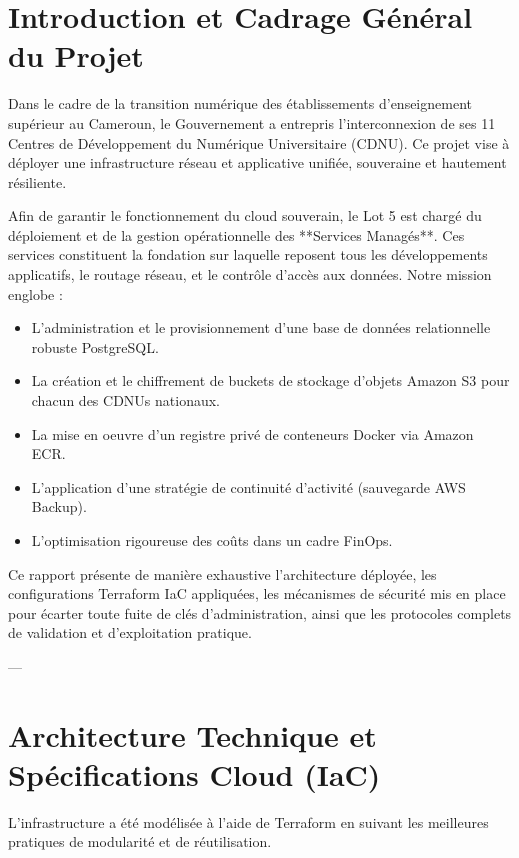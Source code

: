 \documentclass[12pt,a4paper]{article}
\begin{document}
\newpage
\tableofcontents
\newpage

\section{Introduction et Cadrage Général du Projet}
Dans le cadre de la transition numérique des établissements d'enseignement supérieur au Cameroun, le Gouvernement a entrepris l'interconnexion de ses 11 Centres de Développement du Numérique Universitaire (CDNU). Ce projet vise à déployer une infrastructure réseau et applicative unifiée, souveraine et hautement résiliente. 

Afin de garantir le fonctionnement du cloud souverain, le Lot 5 est chargé du déploiement et de la gestion opérationnelle des **Services Managés**. Ces services constituent la fondation sur laquelle reposent tous les développements applicatifs, le routage réseau, et le contrôle d'accès aux données. Notre mission englobe :
\begin{itemize}
    \item L'administration et le provisionnement d'une base de données relationnelle robuste PostgreSQL.
    \item La création et le chiffrement de buckets de stockage d'objets Amazon S3 pour chacun des CDNUs nationaux.
    \item La mise en oeuvre d'un registre privé de conteneurs Docker via Amazon ECR.
    \item L'application d'une stratégie de continuité d'activité (sauvegarde AWS Backup).
    \item L'optimisation rigoureuse des coûts dans un cadre FinOps.
\end{itemize}

Ce rapport présente de manière exhaustive l'architecture déployée, les configurations Terraform IaC appliquées, les mécanismes de sécurité mis en place pour écarter toute fuite de clés d'administration, ainsi que les protocoles complets de validation et d'exploitation pratique.

---

\section{Architecture Technique et Spécifications Cloud (IaC)}
L'infrastructure a été modélisée à l'aide de Terraform en suivant les meilleures pratiques de modularité et de réutilisation.
\end{document}
